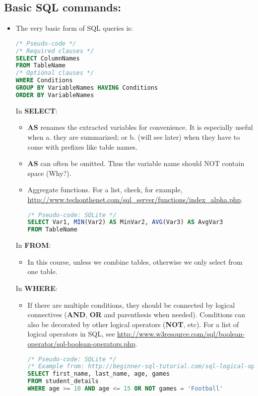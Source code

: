 \documentclass[12pt]{article}
\begin{document}
\subsection{Basic SQL commands:}
\begin{itemize}
	\item The very basic form of SQL queries is:
\begin{lstlisting}[style=displaycode, language=SQL]
/* Pseudo-code */
/* Required clauses */
SELECT ColumnNames
FROM TableName
/* Optional clauses */
WHERE Conditions
GROUP BY VariableNames HAVING Conditions
ORDER BY VariableNames
\end{lstlisting}
	In {\bf SELECT}:
	\begin{itemize}[label=*]
		\item {\bf AS} renames the extracted variables for convenience. It is especially useful when a. they are summarized; or b. (will see later) when they have to come with prefixes like table names.
		\item {\bf AS} can often be omitted. Thus the variable name should NOT contain space (Why?).
		\item Aggregate functions. For a list, check, for example, \url{http://www.techonthenet.com/sql_server/functions/index_alpha.php}.
\begin{lstlisting}[style=displaycode, language=SQL]
/* Pseudo-code: SQLite */
SELECT Var1, MIN(Var2) AS MinVar2, AVG(Var3) AS AvgVar3
FROM TableName
\end{lstlisting}
	\end{itemize}
	In {\bf FROM}:
	\begin{itemize}[label=*]
		\item In this course, unless we combine tables, otherwise we only select from one table.
	\end{itemize}
	In {\bf WHERE}:
	\begin{itemize}[label=*]
		\item If there are multiple conditions, they should be connected by logical connectives ({\bf AND}, {\bf OR} and parenthesis when needed). Conditions can also be decorated by other logical operators ({\bf NOT}, etc). For a list of logical operators in SQL, see \url{http://www.w3resource.com/sql/boolean-operator/sql-boolean-operators.php}.
\begin{lstlisting}[style=displaycode, language=SQL]
/* Pseudo-code: SQLite */
/* Example from: http://beginner-sql-tutorial.com/sql-logical-operators.htm */
SELECT first_name, last_name, age, games
FROM student_details
WHERE age >= 10 AND age <= 15 OR NOT games = 'Football'

\end{lstlisting}
\end{itemize}
\end{itemize}
\end{document}
